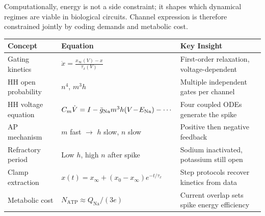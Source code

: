 Computationally, energy is not a side constraint; it shapes which dynamical regimes are viable in biological circuits. Channel expression is therefore constrained jointly by coding demands and metabolic cost.


\begin{chaptersummary}

\begin{center}
\renewcommand{\arraystretch}{1.6}
\begin{tabularx}{\textwidth}{@{}l X X@{}}
  \toprule
  \textbf{Concept} & \textbf{Equation} & \textbf{Key Insight} \\
  \midrule
  Gating kinetics &
  $\displaystyle \dot{x} = \frac{x_\infty(V) - x}{\tau_x(V)}$ &
  First-order relaxation, voltage-dependent \\
  HH open probability &
  $n^4$, \; $m^3 h$ &
  Multiple independent gates per channel \\
  HH voltage equation &
  $C_m\dot{V} = I - \bar{g}_{\mathrm{Na}}m^3h(V\!-\!E_{\mathrm{Na}}) - \cdots$ &
  Four coupled ODEs generate the spike \\
  AP mechanism &
  $m$ fast $\to$ $h$ slow, $n$ slow &
  Positive then negative feedback \\
  Refractory period &
  Low $h$, high $n$ after spike &
  Sodium inactivated, potassium still open \\
  Clamp extraction &
  $x(t)=x_\infty+(x_0-x_\infty)e^{-t/\tau_x}$ &
  Step protocols recover kinetics from data \\
  Metabolic cost &
  $N_{\text{ATP}} \approx Q_{\text{Na}}/(3e)$ &
  Current overlap sets spike energy efficiency \\
  \bottomrule
\end{tabularx}
\end{center}

\end{chaptersummary}

